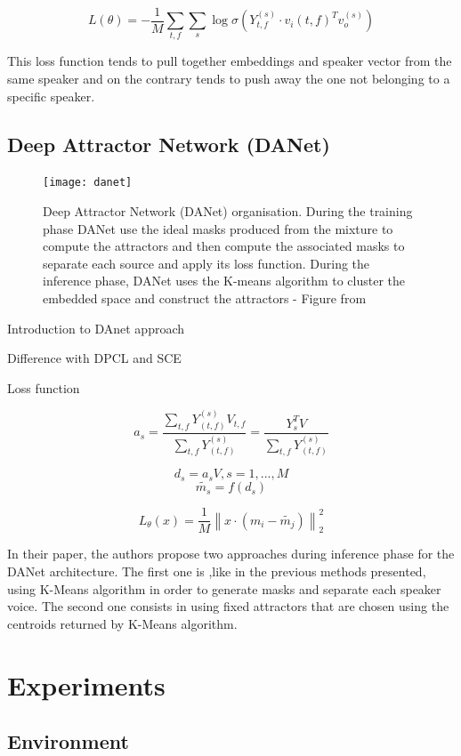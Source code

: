 \documentclass[master, tikz, final,11pt, dvipdfmx]{iscs-thesis}
\newcommand{\norm}[1]{\left\lVert#1\right\rVert}
\begin{document}
\


\[L(\theta) = - \frac{1}{M} \sum_{t,f} \sum_{s} \log \sigma(Y_{t,f}^{(s)} \cdot v_i(t,f)^{T} v_o^{(s)})\]

This loss function tends to pull together embeddings and speaker vector from the same speaker and on the contrary tends to push away the one not belonging to a specific speaker.


\section{Deep Attractor Network (DANet)}

\begin{figure}[ht]
\centering
\texttt{[image: danet]}
\caption[Deep Attractor Network Architecture]{ Deep Attractor Network (DANet) organisation. During the training phase DANet use the ideal masks produced from the mixture to compute the attractors and then compute the associated masks to separate each source and apply its loss function. During the inference phase, DANet uses the K-means algorithm to cluster the embedded space and construct the attractors - Figure from \cite{DANet}}
\label{fig:danet}
\end{figure}

Introduction to DAnet approach

Difference with DPCL and SCE

Loss function

\[a_s = \frac{\sum_{t,f}{Y_{(t,f)}^{(s)}V_{t,f} }}{\sum_{t,f}{Y_{(t,f)}^{(s)}}} = \frac{{Y_s^TV}}{\sum_{t,f}{Y_{(t,f)}^{(s)}}}\]

\[d_s = a_sV, s = 1,..., M \]
\[\tilde{m_s} = f(d_s)\]

\[L_\theta(x) = \frac{1}{M} \norm{x \cdot (m_i - \tilde{m_j})}^2_2 \]

In their paper, the authors propose two approaches during inference phase for the DANet architecture. The first one is ,like in the previous methods presented, using K-Means algorithm in order to generate masks and separate each speaker voice. The second one consists in using fixed attractors that are chosen using the centroids returned by K-Means algorithm.

\chapter{Experiments}

\section{Environment}
\end{document}
